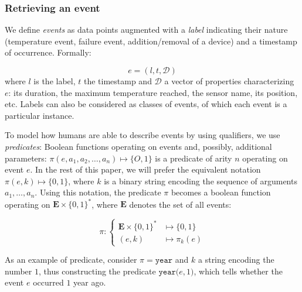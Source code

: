 \documentclass[entropy,article,submit,moreauthors,pdftex]{Definitions/mdpi}
\begin{document}
\subsubsection{Retrieving an event}

We define \emph{events} as data points augmented with a \emph{label} indicating their nature (temperature event, failure event, addition/removal of a device) and a timestamp of occurrence. Formally:

\begin{equation}
    \label{eq:event}
    e = (l, t,\mathcal{D})
\end{equation}
where $l$ is the label, $t$ the timestamp and $\mathcal{D}$ a vector of properties characterizing $e$: its duration, the maximum temperature reached, the sensor name, its position, etc. Labels can also be considered as classes of events, of which each event is a particular instance.

To model how humans are able to describe events by using qualifiers, we use \emph{predicates}: Boolean functions operating on events and, possibly, additional parameters: $\pi(e, a_1, a_2, \dots, a_n) \mapsto \{O,1\}$ is a predicate of arity $n$ operating on event $e$. In the rest of this paper, we will prefer the equivalent notation $\pi(e, k) \mapsto \{0,1\}$, where $k$ is a binary string encoding the sequence of arguments $a_1, \dots, a_n$. Using this notation, the predicate $\pi$ becomes a boolean function operating on $\mathbf{E} \times \{0,1\}^*$, where $\mathbf{E}$ denotes the set of all events:

\begin{equation}
    \label{eq:predicate}
    \pi : \begin{cases}
        \mathbf{E}\times \{0,1\}^{*} & \mapsto \{0,1\}    \\
        (e, k)                        & \mapsto \pi_{k}(e)
    \end{cases}
\end{equation}

As an example of predicate, consider $\pi = \mathtt{year}$ and $k$ a string encoding the number $1$, thus
constructing the predicate $\mathtt{year(}e, 1\mathtt{)}$, which tells whether
the event $e$ occurred $1$ year ago.
\end{document}
